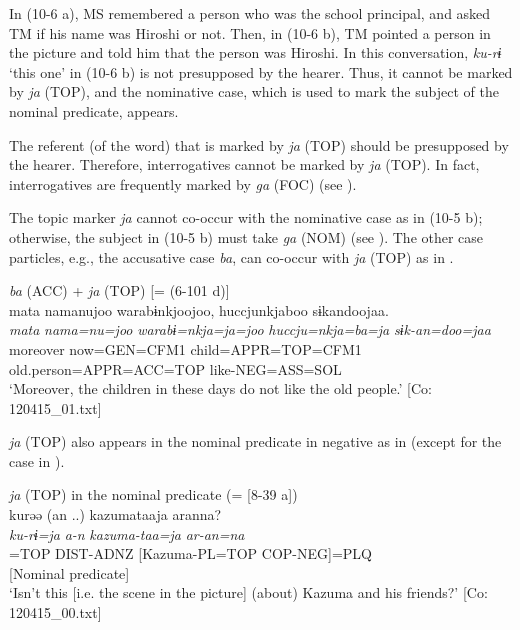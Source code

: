 In (10-6 a), MS remembered a person who was the school principal, and asked TM if his name was Hiroshi or not. Then, in (10-6 b), TM pointed a person in the picture and told him that the person was Hiroshi. In this conversation, \textit{ku-rɨ} ‘this one’ in (10-6 b) is not presupposed by the hearer. Thus, it cannot be marked by \textit{ja} (TOP), and the nominative case, which is used to mark the subject of the nominal predicate, appears.

  The referent (of the word) that is marked by \textit{ja} (TOP) should be presupposed by the hearer. Therefore, interrogatives cannot be marked by \textit{ja} (TOP). In fact, interrogatives are frequently marked by \textit{ga} (FOC) (see ).

  The topic marker \textit{ja} cannot co-occur with the nominative case as in (10-5 b); otherwise, the subject in (10-5 b) must take \textit{ga} (NOM) (see ). The other case particles, e.g., the accusative case \textit{ba}, can co-occur with \textit{ja} (TOP) as in .

\ea\label{ex:10.7}   \textit{ba} (ACC) + \textit{ja} (TOP) [= (6-101 d)]\\
      \glll    mata  namanujoo  warabɨnkjoojoo, huccjunkjaboo  sɨkandoojaa.\\
    \textit{mata}  \textit{nama=nu=joo}  \textit{warabɨ=nkja=ja=joo}    \textit{huccju=nkja=ba=ja}  \textit{sɨk-an=doo=jaa}\\
    moreover  now=GEN=CFM1  child=APPR=TOP=CFM1  old.person=APPR=ACC=TOP  like-NEG=ASS=SOL\\
\glt     ‘Moreover, the children in these days do not like the old people.’  [Co: 120415\_01.txt]
\z

  \textit{ja} (TOP) also appears in the nominal predicate in negative as in  (except for the case in ).

\ea\label{ex:10.8}   \textit{ja} (TOP) in the nominal predicate (= [8-39 a])\\
      \gllll    kurəə  {(an ..)}  kazumataaja  aranna?\\
    \textit{ku-rɨ=ja}  \textit{a-n}  \textit{kazuma-taa=ja}  \textit{ar-an=na}\\
    [PROX-NLZ]=TOP  DIST-ADNZ  [Kazuma-PL=TOP  COP-NEG]=PLQ\\
    [Subject]    [Nominal predicate]\\
    \glt ‘Isn’t this [i.e. the scene in the picture] (about) Kazuma and his friends?’ [Co: 120415\_00.txt]
\z    


